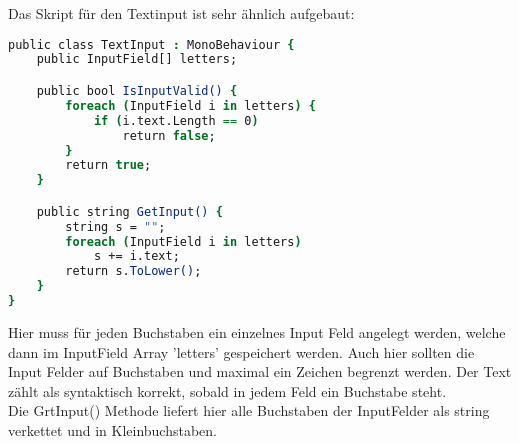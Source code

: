{Das Skript für den Textinput ist sehr ähnlich aufgebaut:
\begin{lstlisting}[language=csh, caption={Skript für einen zweistelligen Zahlen Input}]
public class TextInput : MonoBehaviour {
    public InputField[] letters;

    public bool IsInputValid() {
        foreach (InputField i in letters) {
            if (i.text.Length == 0)
                return false;
        }
        return true;
    }

    public string GetInput() {
        string s = "";
        foreach (InputField i in letters)
            s += i.text;
        return s.ToLower();
    }
}
\end{lstlisting}
Hier muss für jeden Buchstaben ein einzelnes Input Feld angelegt werden, welche dann im InputField Array 'letters' gespeichert werden. Auch hier sollten die Input Felder auf Buchstaben und maximal ein Zeichen begrenzt werden. Der Text zählt als syntaktisch korrekt, sobald in jedem Feld ein Buchstabe steht.\\
Die GrtInput() Methode liefert hier alle Buchstaben der InputFelder als string verkettet und in Kleinbuchstaben.

}
